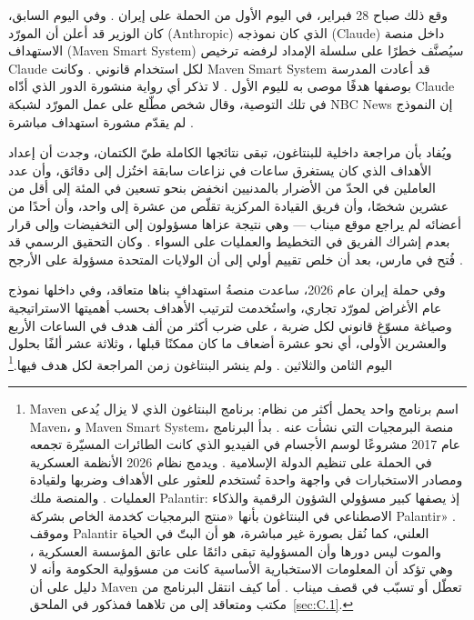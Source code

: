 وقع ذلك صباح 28 فبراير، في اليوم الأول من الحملة على إيران \autocite{Amnesty2026Minab,crs2026iranwar}. وفي اليوم السابق، كان الوزير قد أعلن أن المورّد (Anthropic) الذي كان نموذجه (Claude) داخل منصة الاستهداف (Maven Smart System) سيُصنَّف خطرًا على سلسلة الإمداد لرفضه ترخيص Claude لكل استخدام قانوني \autocite{npr2026openai}. وكانت Maven Smart System قد أعادت المدرسة بوصفها هدفًا موصى به لليوم الأول \autocite{livingstone2026maven,gizmodo2026minab}. لا تذكر أي رواية منشورة الدور الذي أدّاه Claude في تلك التوصية، وقال شخص مطّلع على عمل المورّد لشبكة NBC News إن النموذج لم يقدّم مشورة استهداف مباشرة \autocite{nbc2026targeting}.

ويُفاد بأن مراجعة داخلية للبنتاغون، تبقى نتائجها الكاملة طيّ الكتمان، وجدت أن إعداد الأهداف الذي كان يستغرق ساعات في نزاعات سابقة اختُزل إلى دقائق، وأن عدد العاملين في الحدّ من الأضرار بالمدنيين انخفض بنحو تسعين في المئة إلى أقل من عشرين شخصًا، وأن فريق القيادة المركزية تقلّص من عشرة إلى واحد، وأن أحدًا من أعضائه لم يراجع موقع ميناب — وهي نتيجة عزاها مسؤولون إلى التخفيضات وإلى قرار بعدم إشراك الفريق في التخطيط والعمليات على السواء \autocite{Bloomberg2026KillChain}. وكان التحقيق الرسمي قد فُتح في مارس، بعد أن خلص تقييم أولي إلى أن الولايات المتحدة مسؤولة على الأرجح \autocite{NPR2026MinabProbe}.

وفي حملة إيران عام 2026، ساعدت منصةُ استهدافٍ بناها متعاقد، وفي داخلها نموذج عام الأغراض لمورّد تجاري، واستُخدمت لترتيب الأهداف بحسب أهميتها الاستراتيجية وصياغة مسوّغ قانوني لكل ضربة \autocite{livingstone2026maven}، على ضرب أكثر من ألف هدف في الساعات الأربع والعشرين الأولى، أي نحو عشرة أضعاف ما كان ممكنًا قبلها \autocite{csis2026maven}، وثلاثة عشر ألفًا بحلول اليوم الثامن والثلاثين \autocite{breakingdefense2026maven}. ولم ينشر البنتاغون زمن المراجعة لكل هدف فيها.\footnote{Maven اسم برنامج واحد يحمل أكثر من نظام: برنامج البنتاغون الذي لا يزال يُدعى Maven، و Maven Smart System، منصة البرمجيات التي نشأت عنه \autocite{csis2026maven}. بدأ البرنامج عام 2017 مشروعًا لوسم الأجسام في الفيديو الذي كانت الطائرات المسيّرة تجمعه في الحملة على تنظيم الدولة الإسلامية \autocite{weisgerber2017maven,fang2019maven}. ويدمج نظام 2026 الأنظمة العسكرية ومصادر الاستخبارات في واجهة واحدة تُستخدم للعثور على الأهداف وضربها ولقيادة العمليات \autocite{defensescoop2026transition}. والمنصة ملك Palantir: إذ يصفها كبير مسؤولي الشؤون الرقمية والذكاء الاصطناعي في البنتاغون بأنها «منتج البرمجيات كخدمة الخاص بشركة Palantir» \autocite{defensescoop2026transition}. وموقف Palantir العلني، كما نُقل بصورة غير مباشرة، هو أن البتّ في الحياة والموت ليس دورها وأن المسؤولية تبقى دائمًا على عاتق المؤسسة العسكرية \autocite{lee2026palantir}، وهي تؤكد أن المعلومات الاستخبارية الأساسية كانت من مسؤولية الحكومة وأنه لا دليل على أن Maven تعطّل أو تسبّب في قصف ميناب \autocite{Bloomberg2026KillChain}. أما كيف انتقل البرنامج من مكتب ومتعاقد إلى من تلاهما فمذكور في الملحق~\ref{sec:C.1}.}

